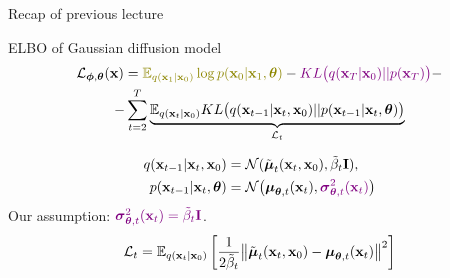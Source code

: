 \begin{frame}{Recap of previous lecture}
	\begin{block}{ELBO of Gaussian diffusion model}
		\vspace{-0.7cm}
		\begin{multline*}
			\cL_{\bphi, \btheta}(\bx) =  {\color{olive}\bbE_{q(\bx_1 | \bx_0)} \log p(\bx_0 | \bx_1, \btheta)} - {\color{violet}KL\bigl(q(\bx_T | \bx_0) || p(\bx_T)\bigr)} - \\
			- \sum_{t=2}^T  \underbrace{ \bbE_{q(\bx_t | \bx_0)}KL \bigl(q(\bx_{t-1} | \bx_t, \bx_0) || p(\bx_{t - 1} | \bx_t, \btheta )\bigr)}_{\cL_t}
		\end{multline*}
		\vspace{-1.0cm}
	\end{block}
	\begin{align*}
		q(\mathbf{x}_{t-1} | \mathbf{x}_t, \mathbf{x}_0) &= \mathcal{N}(\tilde{\boldsymbol{\mu}}_t(\mathbf{x}_t, \mathbf{x}_0), \tilde{\beta}_t \mathbf{I}), \\
		p(\mathbf{x}_{t - 1} | \mathbf{x}_t, \boldsymbol{\theta}) &= \mathcal{N} \bigl(\boldsymbol{\mu}_{\boldsymbol{\theta}, t}(\mathbf{x}_t), {\color{violet}\boldsymbol{\sigma}_{\boldsymbol{\theta}, t}^2(\mathbf{x}_t)}\bigr)
	\end{align*}
	Our assumption:	${\color{violet}\boldsymbol{\sigma}_{\boldsymbol{\theta}, t}^2(\mathbf{x}_t) = \tilde{\beta}_t \mathbf{I}}$.
	\[
		\mathcal{L}_t = \mathbb{E}_{q(\mathbf{x}_t | \mathbf{x}_0)} \left[\frac{1}{2\tilde{\beta}_t} \bigl\| \tilde{\boldsymbol{\mu}}_t(\mathbf{x}_t, \mathbf{x}_0) - \boldsymbol{\mu}_{\boldsymbol{\theta}, t}(\mathbf{x}_t) \bigr\|^2  \right]
	\]
\end{frame}
